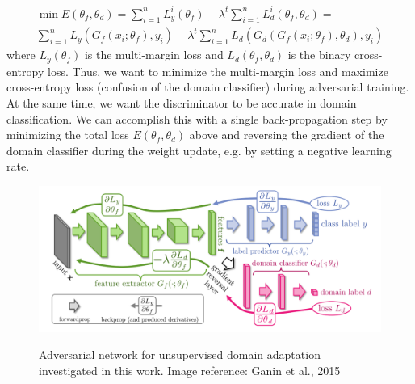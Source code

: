 \documentclass{sigkddExp}
\begin{document}
\begin{itemize}[topsep=0pt,itemsep=-1ex,partopsep=1ex,parsep=1ex]
{    \begin{eqnarray}
     \min E(\theta_f, \theta_d) = \sum_{i=1}^{n}L_{y}^{i}(\theta_f) - \lambda^{t}\sum_{i=1}^{n}L_{d}^{i}(\theta_f, \theta_d) = \\
     \sum_{i=1}^{n}L_y(G_f(x_i;\theta_f), y_i) 
      - \lambda^{t} \sum_{i=1}^{n}L_d(G_d(G_f(x_i;\theta_f), \theta_d), y_i)
    \end{eqnarray}
    where $L_y(\theta_f)$ is the multi-margin loss and $L_d(\theta_f, \theta_d)$ is the binary cross-entropy loss. Thus, we want to minimize the multi-margin loss and maximize cross-entropy loss (confusion of the domain classifier) during adversarial training. At the same time, we want the discriminator to be accurate in domain classification. We can accomplish this with a single back-propagation step by minimizing the total loss $E(\theta_f, \theta_d)$ above and reversing the gradient of the domain classifier during the weight update, e.g. by setting a negative learning rate.
    }
    
\end{itemize}


\begin{figure}[h]
\centering
\includegraphics[width=\columnwidth]{img/adversary.png}
\label{fig:adversary}
\caption{Adversarial network for unsupervised domain adaptation investigated in this work. Image reference: Ganin et al., 2015 \protect\cite{ganin2015unsupervised}}
\end{figure}
 
\end{document}
